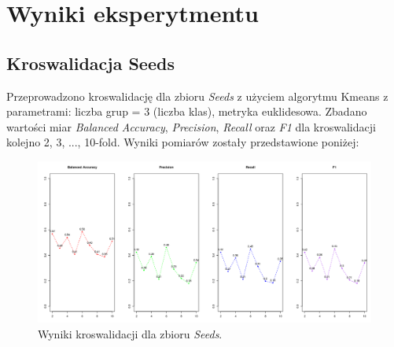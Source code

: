 \pagebreak
\section{Wyniki eksperytmentu}






\subsection{Kroswalidacja Seeds}
Przeprowadzono kroswalidację dla zbioru \textit{Seeds} z użyciem algorytmu Kmeans z parametrami: liczba grup = 3 (liczba klas), metryka euklidesowa.
Zbadano wartości miar \textit{Balanced Accuracy}, \textit{Precision}, \textit{Recall} oraz \textit{F1} dla kroswalidacji kolejno 2, 3, ..., 10-fold.
Wyniki pomiarów zostały przedstawione poniżej:

\begin{figure}[H]
  \center
  \includegraphics[width=\textwidth]{resources/cv.png}
  \caption{Wyniki kroswalidacji dla zbioru \textit{Seeds}.}
\end{figure}
